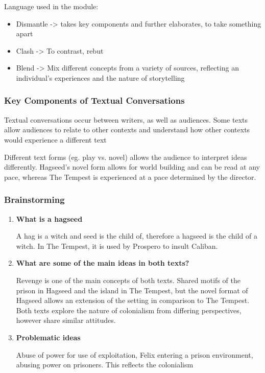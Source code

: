 		Language used in the module:
		\begin{itemize}
			\item Dismantle -> takes key components and further elaborates, to take something apart
			\item Clash -> To contrast, rebut
			\item Blend -> Mix different concepts from a variety of sources, reflecting an individual's experiences and the nature of storytelling
		\end{itemize}

		\subsubsection{Key Components of Textual Conversations}
			Textual conversations occur between writers, as well as audiences. Some texts allow audiences to relate to other contexts and understand how other contexts would experience a different text

			Different text forms (eg. play vs. novel) allows the audience to interpret ideas differently. Hagseed's novel form allows for world building and can be read at any pace, whereas The Tempest is experienced at a pace determined by the director.

		\subsubsection{Brainstorming}
		\begin{enumerate}
			\item \textbf{What is a hagseed}

				A hag is a witch and seed is the child of, therefore a hagseed is the child of a witch. In The Tempest, it is used by Prospero to insult Caliban.
			\item \textbf{What are some of the main ideas in both texts?}

				Revenge is one of the main concepts of both texts. Shared motifs of the prison in Hagseed and the island in The Tempest, but the novel format of Hagseed allows an extension of the setting in comparison to The Tempest. Both texts explore the nature of colonialism from differing perspectives, however share similar attitudes.

			\item \textbf{Problematic ideas}

				Abuse of power for use of exploitation, Felix entering a prison environment, abusing power on prisoners. This reflects the colonialism
		\end{enumerate}

